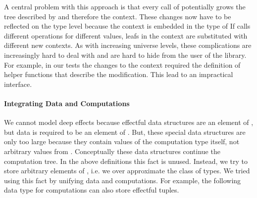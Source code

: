% 

A central problem with this approach is that every call of \AgdaFunction{>>=}
potentially grows the tree described by  and therefore the
context.
These changes now have to be reflected on the type level because the context is
embedded in the type of 
If \AgdaFunction{>>=} calls different operations for different values, leafs in
the context are substituted with different new contexts.
As with increasing universe levels, these complications are increasingly hard to
deal with and are hard to hide from the user of the library.
For example, in our tests the changes to the context required the definition of
helper functions that describe the modification.
This lead to an impractical interface.

\paragraph{Integrating Data and Computations}
We cannot model deep effects because effectful data structures are an element
of , but data is required to be an element of
.
But, these special data structures are only too large because they contain
values of the computation type  itself, not arbitrary values
from .
Conceptually these data structures continue the computation tree.
In the above definitions this fact is unused.
Instead, we try to store arbitrary elements of , i.e. we over
approximate the class of types.
We tried using this fact by unifying data and computations.
For example, the following data type for computations can also store effectful
tuples.

